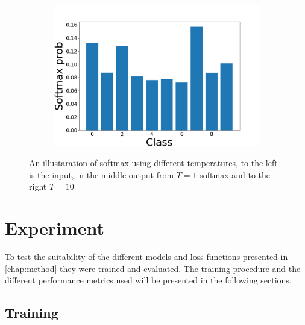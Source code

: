 \documentclass{kththesis}
\begin{document}
\begin{figure}[h]
\begin{subfigure}[b]{0.3\textwidth}
        \includegraphics[width=\textwidth]{softmaxT10}
      \end{subfigure}
     \caption{An illustaration of softmax using different temperatures, to the
       left is the input, in the middle output from \(T=1\) softmax and to the
       right \(T = 10\)}\label{fig:softmax}
\end{figure}



\chapter{Experiment}
To test the suitability of the different models and loss functions presented in
\cref{chap:method} they were trained and evaluated. The training procedure and
the different performance metrics used will be presented in the following
sections.

\section{Training}

\end{document}
